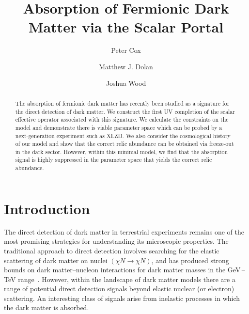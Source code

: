 \documentclass[aps, prd, reprint, nofootinbib, amsmath, amssymb, floatfix]{revtex4-2}
\begin{document}
\title{Absorption of Fermionic Dark Matter via the Scalar Portal}

\author{Peter Cox}
\author{Matthew J. Dolan}
\author{Joshua Wood}



\begin{abstract}
The absorption of fermionic dark matter has recently been studied as a signature for the direct detection of dark matter. We construct the first UV completion of the scalar effective operator associated with this signature. We calculate the constraints on the model and demonstrate there is viable parameter space which can be probed by a next-generation experiment such as XLZD. We also consider the cosmological history of our model and show that the correct relic abundance can be obtained via freeze-out in the dark sector. However, within this minimal model, we find that the absorption signal is highly suppressed in the parameter space that yields the correct relic abundance. 
\end{abstract}

\maketitle


\section{\label{sec:intro}Introduction}

The direct detection of dark matter in terrestrial experiments remains one of the most promising strategies for understanding its microscopic properties. The traditional approach to direct detection involves searching for the elastic scattering of dark matter on nuclei $(\chi N \to \chi N)$, and has produced strong bounds on dark matter--nucleon interactions for dark matter masses in the GeV\,--\,TeV range~\cite{LUX-ZEPLIN:2022xrq}. However, within the landscape of dark matter models there are a range of potential direct detection signals beyond elastic nuclear (or electron) scattering. An interesting class of signals arise from inelastic processes in which the dark matter is absorbed.
\end{document}
